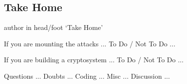 \documentclass[9pt]{beamer}
\begin{document}
\subsection{Take Home}
\begin{frame}
\begin{beamercolorbox}[ht=2.5ex,dp=1.125ex,center,rounded=true,shadow=true]{author in head/foot}
`Take Home'
\end{beamercolorbox}
\end{frame}

\begin{frame}
If you are mounting the attacks ... To Do / Not To Do ...

\end{frame}

\begin{frame}
If you are building a cryptosystem ... To Do / Not To Do ...

\end{frame}

\begin{frame}
Questions ... Doubts ... Coding ... Misc ... Discussion ...

\end{frame}
\end{document}
